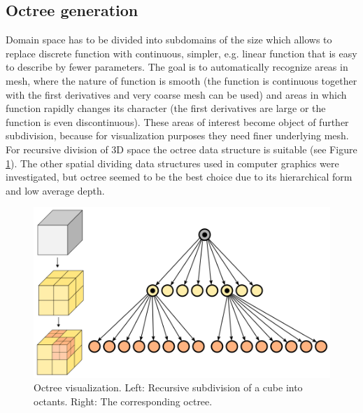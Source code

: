 
\subsection{Octree generation}

Domain space has to be divided into subdomains of the size which allows to replace discrete function with continuous, simpler, e.g. linear function that is easy to describe by fewer parameters. The goal is to automatically recognize areas in mesh, where the nature of function is smooth (the function is continuous together with the first derivatives and very coarse mesh can be used) and areas in which function rapidly changes its character (the first derivatives are large or the function is even discontinuous). These areas of interest become object of further subdivision, because for visualization purposes they need finer underlying mesh. For recursive division of 3D space the octree data structure is suitable (see Figure \ref{fig:octree-visualization}). The other spatial dividing data structures used in computer graphics were investigated, but octree seemed to be the best choice due to its hierarchical form and low average depth.

\begin{figure}[H]
\centering
\includegraphics[width=\textwidth]{figures/appendix-approximation/figure1}
\decoRule
\caption[Octree visualization]{Octree visualization. Left: Recursive subdivision of a cube into octants. Right: The corresponding octree.}
\label{fig:octree-visualization}
\end{figure}


